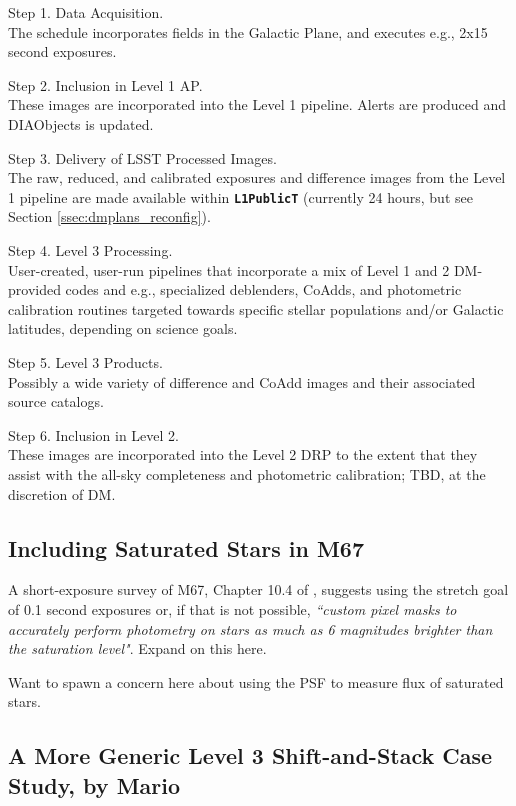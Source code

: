 \documentclass[DM,lsstdraft,toc]{lsstdoc}
\begin{document}
Step 1. Data Acquisition. \\ The schedule incorporates fields in the Galactic Plane, and executes e.g., 2x15 second exposures.

Step 2. Inclusion in Level 1 AP. \\ These images are incorporated into the Level 1 pipeline. Alerts are produced and DIAObjects is updated.

Step 3. Delivery of LSST Processed Images. \\ The raw, reduced, and calibrated exposures and difference images from the Level 1 pipeline are made available within {\tt \textbf{L1PublicT}} (currently 24 hours, but see Section \ref{ssec:dmplans_reconfig}).

Step 4. Level 3 Processing. \\ User-created, user-run pipelines that incorporate a mix of Level 1 and 2 DM-provided codes and e.g., specialized deblenders, CoAdds, and photometric calibration routines targeted towards specific stellar populations and/or Galactic latitudes, depending on science goals. 

Step 5. Level 3 Products. \\ Possibly a wide variety of difference and CoAdd images and their associated source catalogs.

Step 6. Inclusion in Level 2. \\ These images are incorporated into the Level 2 DRP to the extent that they assist with the all-sky completeness and photometric calibration; TBD, at the discretion of DM.



\subsection{Including Saturated Stars in M67}\label{ssec:SPCS_M67}

A short-exposure survey of M67, Chapter 10.4 of \cite{2017arXiv170804058L}, suggests using the stretch goal of 0.1 second exposures or, if that is not possible, {\it ``custom pixel masks to accurately perform photometry on stars as much as 6 magnitudes brighter than the saturation level"}. Expand on this here. 

Want to spawn a concern here about using the PSF to measure flux of saturated stars.


\subsection{A More Generic Level 3 Shift-and-Stack Case Study, by Mario}\label{ssec:SPCS_SAS}
\end{document}
